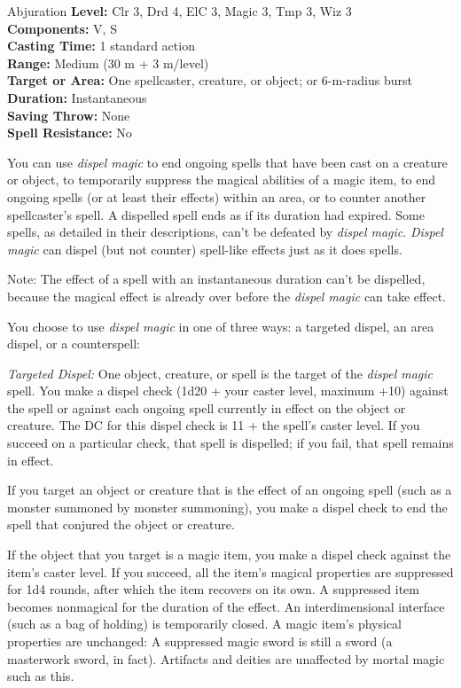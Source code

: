 {Abjuration}
{
	\textbf{Level:}
	Clr 3, Drd 4, ElC 3, Magic 3, Tmp 3, Wiz 3\\
	\textbf{Components:}
	V, S\\
	\textbf{Casting Time:}
	1 standard action\\
	\textbf{Range:}
	Medium (30 m + 3 m/level)\\
	\textbf{Target or Area:}
	One spellcaster, creature, or object; or 6-m-radius burst\\
	\textbf{Duration:}
	Instantaneous\\
	\textbf{Saving Throw:}
	None\\
	\textbf{Spell Resistance:}
	No\\
}
{
	You can use \emph{dispel magic} to end ongoing spells that have been cast on a creature or object, to temporarily suppress the magical abilities of a magic item, to end ongoing spells (or at least their effects) within an area, or to counter another spellcaster's spell. A dispelled spell ends as if its duration had expired. Some spells, as detailed in their descriptions, can't be defeated by \emph{dispel magic}. \emph{Dispel magic} can dispel (but not counter) spell-like effects just as it does spells.

	Note: The effect of a spell with an instantaneous duration can't be dispelled, because the magical effect is already over before the \emph{dispel magic} can take effect.

	You choose to use \emph{dispel magic} in one of three ways: a targeted dispel, an area dispel, or a counterspell:

	\textit{Targeted Dispel:}
	One object, creature, or spell is the target of the \emph{dispel magic} spell. You make a dispel check (1d20 + your caster level, maximum +10) against the spell or against each ongoing spell currently in effect on the object or creature. The DC for this dispel check is 11 + the spell's caster level. If you succeed on a particular check, that spell is dispelled; if you fail, that spell remains in effect.

	If you target an object or creature that is the effect of an ongoing spell (such as a monster summoned by monster summoning), you make a dispel check to end the spell that conjured the object or creature.

	If the object that you target is a magic item, you make a dispel check against the item's caster level. If you succeed, all the item's magical properties are suppressed for 1d4 rounds, after which the item recovers on its own. A suppressed item becomes nonmagical for the duration of the effect. An interdimensional interface (such as a bag of holding) is temporarily closed. A magic item's physical properties are unchanged: A suppressed magic sword is still a sword (a masterwork sword, in fact). Artifacts and deities are unaffected by mortal magic such as this.

}

